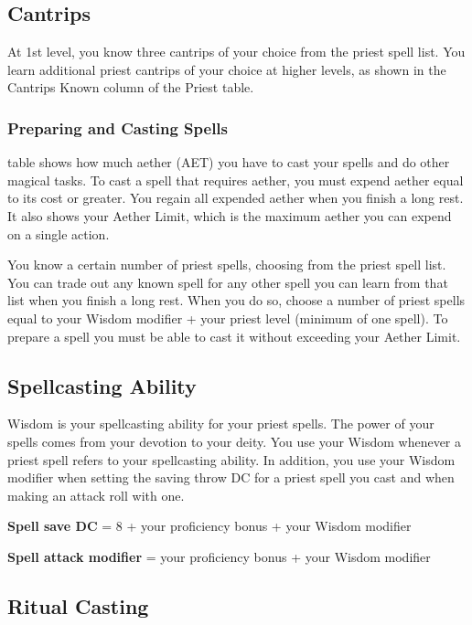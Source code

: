 \subsection{Cantrips}

At 1st level, you know three cantrips of your choice from the priest spell list. You learn additional priest cantrips of your choice at higher levels, as shown in the Cantrips Known column of the Priest table.

\subsubsection{Preparing and Casting Spells}

 table shows how much aether (AET) you have to cast your spells and do other magical tasks. To cast a spell that requires aether, you must expend aether equal to its cost or greater. You regain all expended aether when you finish a long rest. It also shows your Aether Limit, which is the maximum aether you can expend on a single action.

You know a certain number of priest spells, choosing from the priest spell list. You can trade out any known spell for any other spell you can learn from that list when you finish a long rest. When you do so, choose a number of priest spells equal to your Wisdom modifier + your priest level (minimum of one spell). To prepare a spell you must be able to cast it without exceeding your Aether Limit.

\subsection{Spellcasting Ability}

Wisdom is your spellcasting ability for your priest spells. The power of your spells comes from your devotion to your deity. You use your Wisdom whenever a priest spell refers to your spellcasting ability. In addition, you use your Wisdom modifier when setting the saving throw DC for a priest spell you cast and when making an attack roll with one.

\textbf{Spell save DC} = 8 + your proficiency bonus + your Wisdom modifier

\textbf{Spell attack modifier} = your proficiency bonus + your Wisdom modifier

\subsection{Ritual Casting}

